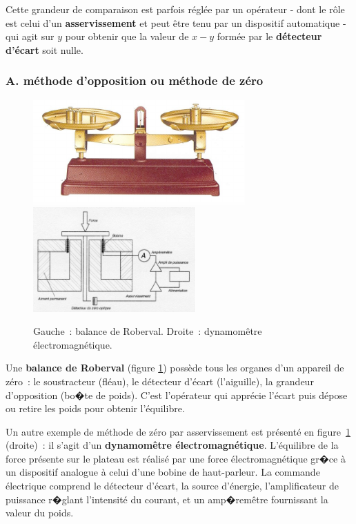 Cette grandeur de comparaison est parfois réglée par un opérateur - dont le rôle est celui d'un \textbf{asservissement} et peut être tenu par un dispositif automatique - qui agit sur $y$ pour obtenir que la valeur de $x-y$ formée par le \textbf{détecteur d'écart} soit nulle.

\subsubsection{A. méthode d'opposition ou méthode de zéro}

\begin{figure}[h]
   \centering
   \includegraphics[height=4cm]{assets/figures/balance.pdf}\hspace{5mm}
   \includegraphics[height=4cm]{assets/figures/dynamo.pdf}
   \caption{Gauche~: balance de Roberval. Droite~: dynamomêtre électromagnétique.}
   \label{fig:balance}
\end{figure}
Une \textbf{balance de Roberval} (figure \ref{fig:balance}) possède tous les organes d'un appareil de zéro~: le soustracteur (fléau), le détecteur d'écart (l'aiguille), la grandeur d'opposition (bo�te de poids). C'est l'opérateur qui apprécie l'écart puis dépose ou retire les poids pour obtenir l'équilibre.

Un autre exemple de méthode de zéro par asservissement est présenté en figure~\ref{fig:balance} (droite)~: il s'agit d'un \textbf{dynamomêtre électromagnétique}. L'équilibre de la force présente sur le plateau est réalisé par une force électromagnétique gr�ce à un dispositif analogue à celui d'une bobine de haut-parleur. La commande électrique comprend le détecteur d'écart, la source d'énergie, l'amplificateur de puissance r�glant l'intensité du courant, et un amp�remêtre fournissant la valeur du poids.

